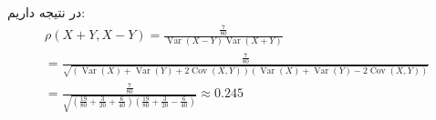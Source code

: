 در نتیجه داریم:
\begin{gather*}
    \rho (X + Y, X - Y) = \frac{\frac{7}{80}}{\operatorname{Var}(X-Y)\operatorname{Var}(X+Y)}\\
    = \frac{\frac{7}{80}}{\sqrt{(\operatorname{Var}(X) + \operatorname{Var}(Y) + 2\operatorname{Cov}(X,Y))(\operatorname{Var}(X) + \operatorname{Var}(Y) - 2\operatorname{Cov}(X,Y))}}\\
    = \frac{\frac{7}{80}}{\sqrt{(\frac{19}{80} + \frac{3}{20} + \frac{6}{40})(\frac{19}{80} + \frac{3}{20} - \frac{6}{40})}} \approx 0.245
\end{gather*}




